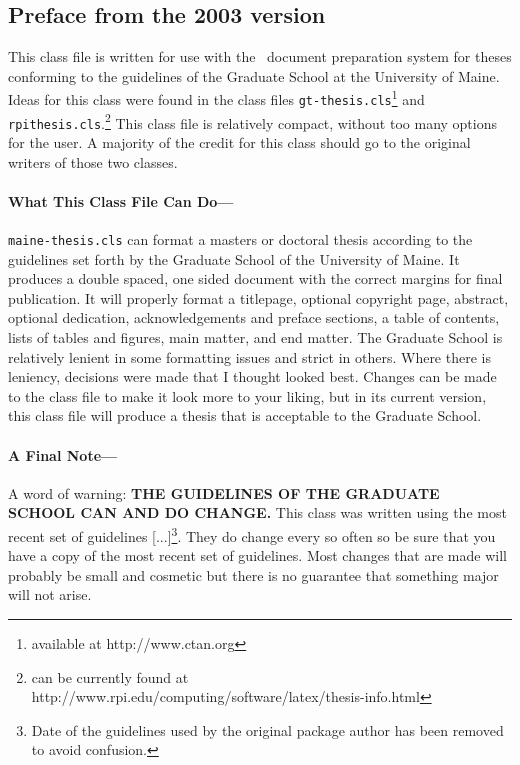 \begin{preface}
\section{Preface from the 2003 version}

 This class file is written for use with the \LaTeXe\ document preparation system for theses
 conforming to the guidelines of the Graduate School at the University of Maine.  
 Ideas for this class were found in  
 the class files \verb=gt-thesis.cls=\footnote{available at
 http://www.ctan.org} and \verb=rpithesis.cls=.\footnote{can be currently found at
  http://www.rpi.edu/computing/software/latex/thesis-info.html}  This class
 file is relatively compact, without too many options for the user.  A majority of the
 credit for this class should go to the original writers of those two classes.  

 \paragraph{What This Class File Can Do---}
 \verb=maine-thesis.cls= can format a masters or doctoral thesis according to the guidelines set
 forth by the Graduate School of the University of Maine.  It produces a double spaced, one sided
 document with the correct margins for final publication. 
 It will properly format a titlepage, 
 optional copyright page, abstract, optional dedication, acknowledgements and preface sections,
 a table of contents, lists of tables and figures, main matter, and end matter.  The Graduate
 School is relatively lenient in some formatting issues and strict in others.  Where there is
 leniency, decisions were made that I thought looked best.  Changes can be made to the class file
 to make it look more to your liking, but in its current version, this class file
 will produce a thesis that is acceptable to the Graduate School.
 \paragraph{A Final Note---}
 A word of warning:  {\bfseries THE GUIDELINES OF THE GRADUATE SCHOOL CAN AND DO CHANGE.}	
 This class was written using the most recent set of guidelines [...]\footnote{Date of the guidelines used by the original package author has been removed to avoid confusion.}.  
 They do change every so often so be sure that you have a copy of the most recent set of
 guidelines.  Most changes that are made will probably be small and cosmetic but there is no guarantee that
 something major will not arise.  
 

\end{preface}
